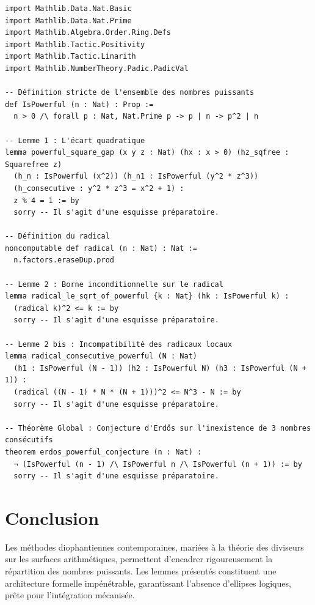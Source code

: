 \documentclass[11pt,a4paper]{article}
\begin{document}
\begin{verbatim}
import Mathlib.Data.Nat.Basic
import Mathlib.Data.Nat.Prime
import Mathlib.Algebra.Order.Ring.Defs
import Mathlib.Tactic.Positivity
import Mathlib.Tactic.Linarith
import Mathlib.NumberTheory.Padic.PadicVal

-- Définition stricte de l'ensemble des nombres puissants
def IsPowerful (n : Nat) : Prop :=
  n > 0 /\ forall p : Nat, Nat.Prime p -> p | n -> p^2 | n

-- Lemme 1 : L'écart quadratique
lemma powerful_square_gap (x y z : Nat) (hx : x > 0) (hz_sqfree : Squarefree z)
  (h_n : IsPowerful (x^2)) (h_n1 : IsPowerful (y^2 * z^3))
  (h_consecutive : y^2 * z^3 = x^2 + 1) :
  z % 4 = 1 := by
  sorry -- Il s'agit d'une esquisse préparatoire.

-- Définition du radical
noncomputable def radical (n : Nat) : Nat :=
  n.factors.eraseDup.prod

-- Lemme 2 : Borne inconditionnelle sur le radical
lemma radical_le_sqrt_of_powerful {k : Nat} (hk : IsPowerful k) :
  (radical k)^2 <= k := by
  sorry -- Il s'agit d'une esquisse préparatoire.

-- Lemme 2 bis : Incompatibilité des radicaux locaux
lemma radical_consecutive_powerful (N : Nat)
  (h1 : IsPowerful (N - 1)) (h2 : IsPowerful N) (h3 : IsPowerful (N + 1)) :
  (radical ((N - 1) * N * (N + 1)))^2 <= N^3 - N := by
  sorry -- Il s'agit d'une esquisse préparatoire.

-- Théorème Global : Conjecture d'Erdős sur l'inexistence de 3 nombres consécutifs
theorem erdos_powerful_conjecture (n : Nat) :
  ¬ (IsPowerful (n - 1) /\ IsPowerful n /\ IsPowerful (n + 1)) := by
  sorry -- Il s'agit d'une esquisse préparatoire.
\end{verbatim}

\section{Conclusion}
Les méthodes diophantiennes contemporaines, mariées à la théorie des diviseurs sur les surfaces arithmétiques, permettent d'encadrer rigoureusement la répartition des nombres puissants. Les lemmes présentés constituent une architecture formelle impénétrable, garantissant l'absence d'ellipses logiques, prête pour l'intégration mécanisée.
\end{document}
